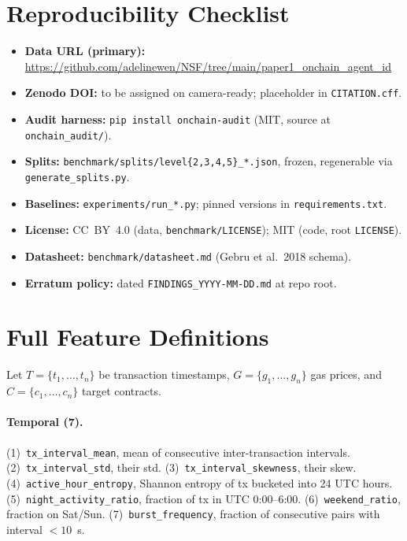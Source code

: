 \documentclass[10pt]{article}
\begin{document}
\section*{Reproducibility Checklist}

\begin{itemize}
    \item \textbf{Data URL (primary):} \url{https://github.com/adelinewen/NSF/tree/main/paper1_onchain_agent_id}
    \item \textbf{Zenodo DOI:} to be assigned on camera-ready; placeholder in \texttt{CITATION.cff}.
    \item \textbf{Audit harness:} \texttt{pip install onchain-audit} (MIT, source at \texttt{onchain\_audit/}).
    \item \textbf{Splits:} \texttt{benchmark/splits/level\{2,3,4,5\}\_*.json}, frozen, regenerable via \texttt{generate\_splits.py}.
    \item \textbf{Baselines:} \texttt{experiments/run\_*.py}; pinned versions in \texttt{requirements.txt}.
    \item \textbf{License:} CC~BY~4.0 (data, \texttt{benchmark/LICENSE}); MIT (code, root \texttt{LICENSE}).
    \item \textbf{Datasheet:} \texttt{benchmark/datasheet.md} (Gebru et al.\ 2018 schema).
    \item \textbf{Erratum policy:} dated \texttt{FINDINGS\_YYYY-MM-DD.md} at repo root.
\end{itemize}




\appendix

\section{Full Feature Definitions}
\label{app:features}

Let $T = \{t_1,\ldots,t_n\}$ be transaction timestamps, $G = \{g_1,\ldots,g_n\}$ gas prices, and $C = \{c_1,\ldots,c_n\}$ target contracts.

\paragraph{Temporal (7).}
(1)~\texttt{tx\_interval\_mean}, mean of consecutive inter-transaction intervals. (2)~\texttt{tx\_interval\_std}, their std. (3)~\texttt{tx\_interval\_skewness}, their skew. (4)~\texttt{active\_hour\_entropy}, Shannon entropy of tx bucketed into 24 UTC hours. (5)~\texttt{night\_activity\_ratio}, fraction of tx in UTC 0:00--6:00. (6)~\texttt{weekend\_ratio}, fraction on Sat/Sun. (7)~\texttt{burst\_frequency}, fraction of consecutive pairs with interval $<10$~s.
\end{document}
